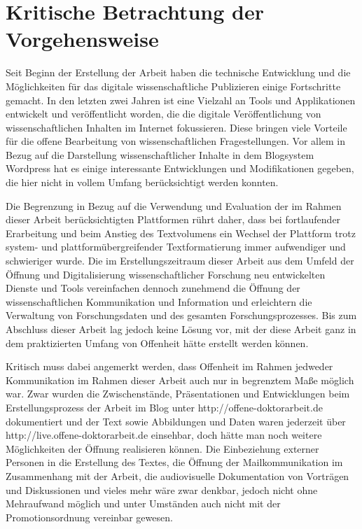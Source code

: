 \section{Kritische Betrachtung der Vorgehensweise}

Seit Beginn der Erstellung der Arbeit haben die technische Entwicklung und die Möglichkeiten für das digitale wissenschaftliche Publizieren einige Fortschritte gemacht. In den letzten zwei Jahren ist eine Vielzahl an Tools und Applikationen entwickelt und veröffentlicht worden, die die digitale Veröffentlichung von wissenschaftlichen Inhalten im Internet fokussieren. Diese bringen viele Vorteile für die offene Bearbeitung von wissenschaftlichen Fragestellungen. Vor allem in Bezug auf die Darstellung wissenschaftlicher Inhalte in dem Blogsystem Wordpress hat es einige interessante Entwicklungen und Modifikationen gegeben, die hier nicht in vollem Umfang berücksichtigt werden konnten.

Die Begrenzung in Bezug auf die Verwendung und Evaluation der im Rahmen dieser Arbeit berücksichtigten Plattformen rührt daher, dass bei fortlaufender Erarbeitung und beim Anstieg des Textvolumens ein Wechsel der Plattform trotz system- und plattformübergreifender Textformatierung immer aufwendiger und schwieriger wurde. Die im Erstellungszeitraum dieser Arbeit aus dem Umfeld der Öffnung und Digitalisierung wissenschaftlicher Forschung neu entwickelten Dienste und Tools vereinfachen dennoch zunehmend die Öffnung der wissenschaftlichen Kommunikation und Information und erleichtern die Verwaltung von Forschungsdaten und des gesamten Forschungsprozesses. Bis zum Abschluss dieser Arbeit lag jedoch keine Lösung vor, mit der diese Arbeit ganz in dem praktizierten Umfang von Offenheit hätte erstellt werden können.

Kritisch muss dabei angemerkt werden, dass Offenheit im Rahmen jedweder Kommunikation im Rahmen dieser Arbeit auch nur in begrenztem Maße möglich war. Zwar wurden die Zwischenstände, Präsentationen und Entwicklungen beim Erstellungsprozess der Arbeit im Blog unter http://offene-doktorarbeit.de dokumentiert und der Text sowie Abbildungen und Daten waren jederzeit über http://live.offene-doktorarbeit.de einsehbar, doch hätte man noch weitere Möglichkeiten der Öffnung realisieren können. Die Einbeziehung externer Personen in die Erstellung des Textes, die Öffnung der Mailkommunikation im Zusammenhang mit der Arbeit, die audiovisuelle Dokumentation von Vorträgen und Diskussionen und vieles mehr wäre zwar denkbar, jedoch nicht ohne Mehraufwand möglich und unter Umständen auch nicht mit der Promotionsordnung vereinbar gewesen.

